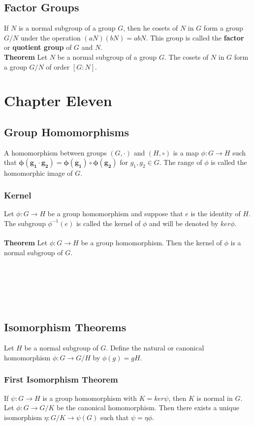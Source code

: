 \documentclass{article}
\begin{document}
\subsection{Factor Groups}
If $N$ is a normal subgroup of a group $G$, then he cosets of $N$ in $G$ form a group $G/N$ under the operation $(aN)(bN)=abN$. This group is called the \textbf{factor} or \textbf{quotient group} of $G$ and $N$.
\\\textbf{Theorem}
Let $N$ be a normal subgroup of a group $G$. The cosets of $N$ in $G$ form a group $G/N$ of order $[G:N]$.
\section{Chapter Eleven}
\subsection{Group Homomorphisms}
A homomorphism between groups $(G, \cdot)$ and $(H, \circ)$ is a map $\phi : G\rightarrow H$ such that 
$\mathbf{\phi (g_1 \cdot g_2)=\phi (g_1) \circ \phi(g_2)}$ for $g_1, g_2 \in G$. The range of $\phi$ is called the homomorphic image of $G$.
\subsubsection{Kernel}
Let $\phi : G\rightarrow H$ be a group homomorphism and suppose that $e$ is the identity of $H$. The subgroup $\phi ^{-1}({e})$ is called the kernel of $\phi$ and will be denoted by $ker{\phi}$.\\
\\\textbf{Theorem}
Let $\phi : G\rightarrow H$ be a group homomorphism. Then the kernel of $\phi$ is a normal subgroup of $G$.
\\\\\\\\\\\\
\subsection{Isomorphism Theorems}
Let $H$ be a normal subgroup of $G$. Define the natural or canonical homomorphism $\phi : G\rightarrow G/H$ by $\phi(g)=gH$.
\subsubsection{First Isomorphism Theorem}
If $\psi: G\rightarrow H$ is a group homomorphism with $K=ker \psi$, then $K$ is normal in $G$. 
\\
Let $\phi: G\rightarrow G/K$ be the canonical homomorphism. Then there exists a unique isomorphism $\eta: G/K\rightarrow \psi(G)$ such that $\psi = \eta\phi$.
\end{document}
